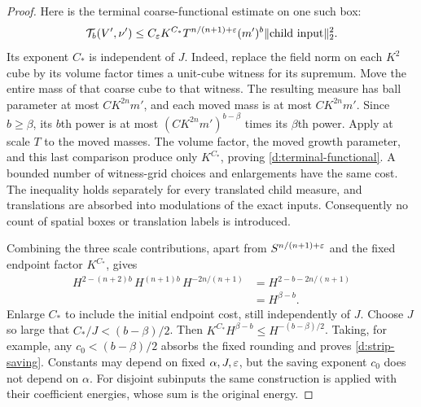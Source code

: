 \begin{proof}
Here is the terminal coarse-functional estimate on one such box:
\begin{equation}
 \mathcal T_b(V',\nu')
 \le C_\varepsilon K^{C_*}T^{n/(n+1)+\varepsilon}(m')^b
                      \lVert \text{child input}\rVert_2^2.
 \label{d:terminal-functional}
\end{equation}
Its exponent $C_*$ is independent of $J$.  Indeed, replace the field
norm on each $K^2$ cube by its volume factor times a unit-cube witness
for its supremum.  Move the entire mass of that coarse cube to that
witness.  The resulting measure has ball parameter at most
$CK^{2n}m'$, and each moved mass is at most $CK^{2n}m'$.
Since $b\ge\beta$, its $b$th power is at most
$(CK^{2n}m')^{b-\beta}$ times its $\beta$th power.
Apply  at scale $T$ to the moved masses.  The volume
factor, the moved growth parameter, and this last comparison produce
only $K^{C_*}$, proving \eqref{d:terminal-functional}.
A bounded number of witness-grid choices and enlargements have the
same cost.  The inequality holds separately for every translated
child measure, and translations are absorbed into modulations of the
exact inputs.  Consequently no count of spatial boxes or translation
labels is introduced.

Combining the three scale contributions, apart from
$S^{n/(n+1)+\varepsilon}$ and the fixed endpoint factor $K^{C_*}$, gives
\begin{align*}
 H^{2-(n+2)b}\,H^{(n+1)b}\,H^{-2n/(n+1)}
   &=H^{2-b-2n/(n+1)}\\
   &=H^{\beta-b}.
\end{align*}
Enlarge $C_*$ to include the initial endpoint cost, still independently
of $J$.  Choose $J$ so large that
$C_*/J<(b-\beta)/2$.  Then
$K^{C_*}H^{\beta-b}\le H^{-(b-\beta)/2}$.
Taking, for example, any $c_0<(b-\beta)/2$ absorbs the fixed rounding
and proves \eqref{d:strip-saving}.  Constants may depend on fixed
$\alpha,J,\varepsilon$, but the saving exponent $c_0$ does not depend on
$\alpha$.  For disjoint subinputs the same construction is applied
with their coefficient energies, whose sum is the original energy.
\end{proof}
